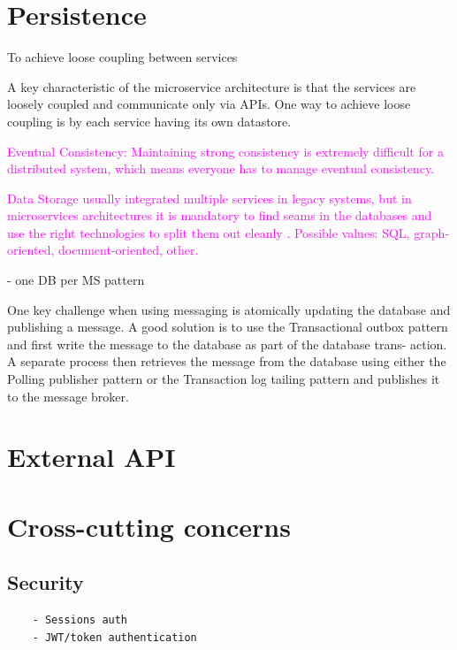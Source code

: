 \documentclass[thesis=M,english,hidelinks]{FITthesis}[2012/10/20]
\begin{document}
% 
% 
\section{Persistence}
\label{sec:persistence}

To achieve loose coupling between services 







A key characteristic of the microservice architecture is that the services are loosely coupled and communicate only via APIs. One way to achieve loose coupling is by each service having its own datastore.



\textcolor{magenta}{Eventual Consistency: Maintaining strong consistency is extremely difficult for a distributed system, which means everyone has to manage eventual consistency.}

\textcolor{magenta}{Data Storage usually integrated multiple services in legacy systems, but in microservices architectures it is mandatory to find seams in the databases and use the right technologies to split them out cleanly \cite{ms-building-ms}. Possible values: SQL, graph-oriented, document-oriented, other.}

- one DB per MS pattern 

One key challenge when using messaging is atomically updating the database and publishing a message. A good solution is to use the Transactional outbox pattern and first write the message to the database as part of the database trans- action. A separate process then retrieves the message from the database using either the Polling publisher pattern or the Transaction log tailing pattern and publishes it to the message broker.
% 
% 
\section{External API}
\label{sec:ext_api}

% 
%
\section{Cross-cutting concerns}
\subsection{Security}
\begin{verbatim}
    - Sessions auth
    - JWT/token authentication
\end{verbatim}
\end{document}
